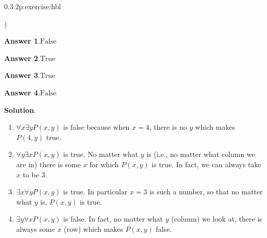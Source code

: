 \documentclass[twoside,11pt,]{book}
\newcommand{\blocktitlefont}{\relax}
\numberwithin{equation}{chapter}
\begin{document}
\begin{divisionsolution}{0.3.2}{}{p:exercise:hbl}
\begin{enumerate}[label=(\alph*)]
\begin{itemize*}[label=$\square$,leftmargin=3em,itemjoin=\hspace{1em}]
\end{itemize*})\quad
%
\end{enumerate}
%
\par\smallskip%
\noindent\textbf{\blocktitlefont Answer 1}.\quad{}\(\text{False}\)%
\par\smallskip%
\noindent\textbf{\blocktitlefont Answer 2}.\quad{}\(\text{True}\)%
\par\smallskip%
\noindent\textbf{\blocktitlefont Answer 3}.\quad{}\(\text{True}\)%
\par\smallskip%
\noindent\textbf{\blocktitlefont Answer 4}.\quad{}\(\text{False}\)%
\par\smallskip%
\noindent\textbf{\blocktitlefont Solution}.\quad{}%
\begin{enumerate}[label=(\alph*)]
\item{}\(\forall x \exists y P(x,y)\) is false because when \(x = 4\text{,}\) there is no \(y\) which makes \(P(4,y)\) true.%
\item{}\(\forall y \exists x P(x,y)\) is true. No matter what \(y\) is (i.e., no matter what column we are in) there is some \(x\) for which \(P(x,y)\) is true. In fact, we can always take \(x\) to be \(3\text{.}\)%
\item{}\(\exists x \forall y P(x,y)\) is true. In particular \(x=3\) is such a number, so that no matter what \(y\) is, \(P(x,y)\) is true.%
\item{}\(\exists y \forall x P(x,y)\) is false. In fact, no matter what \(y\) (column) we look at, there is always some \(x\) (row) which makes \(P(x,y)\) false.%
\end{enumerate}
%
\end{divisionsolution}%
\end{document}
